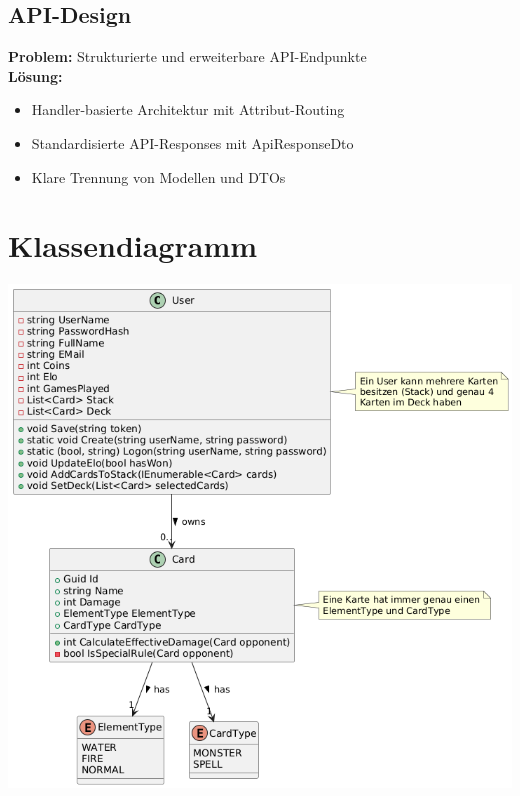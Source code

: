 \documentclass{article}
\begin{document}
\subsection{API-Design}
\textbf{Problem:} Strukturierte und erweiterbare API-Endpunkte\\
\textbf{Lösung:}
\begin{itemize}
    \item Handler-basierte Architektur mit Attribut-Routing
    \item Standardisierte API-Responses mit ApiResponseDto
    \item Klare Trennung von Modellen und DTOs
\end{itemize}

\section{Klassendiagramm}
\begin{center}
    \includegraphics[width=\textwidth]{UML.png}
    \label{fig:uml}
\end{center}
\end{document}
